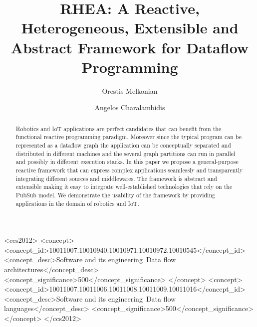 \documentclass[sigplan,screen]{acmart}
\begin{document}


\title[RHEA]{RHEA: A Reactive, Heterogeneous, Extensible and Abstract Framework for Dataflow Programming}

\author{Orestis Melkonian}

\author{Angelos Charalambidis}

\begin{abstract}
Robotics and IoT applications are perfect candidates that can benefit from
the functional reactive programming paradigm. Moreover since the typical
program can be represented as a dataflow graph the application can be conceptually
separated and distributed in different machines and the several graph partitions
can run in parallel and possibly in different execution stacks. In this paper
we propose a general-purpose reactive framework that can express complex
applications seamlessly and transparently integrating different sources and
middlewares. The framework is abstract and extensible making it easy to integrate
well-established technologies that rely on the PubSub model. We demonstrate
the usability of the framework by providing applications in the domain of
robotics and IoT.
\end{abstract}

\begin{CCSXML} <ccs2012> <concept>
<concept_id>10011007.10010940.10010971.10010972.10010545</concept_id>
<concept_desc>Software and its engineering~Data flow
architectures</concept_desc> <concept_significance>500</concept_significance>
</concept> <concept>
<concept_id>10011007.10011006.10011008.10011009.10011016</concept_id>
<concept_desc>Software and its engineering~Data flow languages</concept_desc>
<concept_significance>500</concept_significance> </concept> </ccs2012>
\end{CCSXML}

\end{document}

